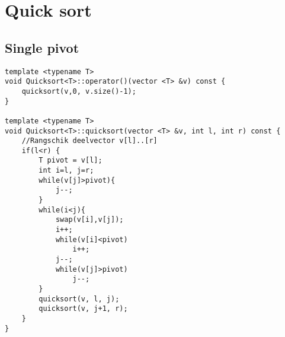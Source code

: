 \documentclass[a4paper]{article}
\begin{document}
\section{Quick sort}
\subsection*{Single pivot}
\begin{lstlisting}
template <typename T>
void Quicksort<T>::operator()(vector <T> &v) const {
    quicksort(v,0, v.size()-1);
}

template <typename T>
void Quicksort<T>::quicksort(vector <T> &v, int l, int r) const {
    //Rangschik deelvector v[l]..[r]
    if(l<r) {
        T pivot = v[l];
        int i=l, j=r;
        while(v[j]>pivot){
            j--;
        }
        while(i<j){
            swap(v[i],v[j]);
            i++;
            while(v[i]<pivot)
                i++;
            j--;
            while(v[j]>pivot)
                j--;
        }
        quicksort(v, l, j);
        quicksort(v, j+1, r);
    }
}
\end{lstlisting}
\end{document}
